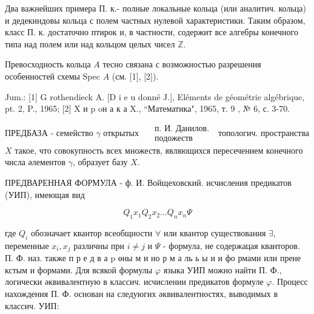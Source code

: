 \documentclass[10pt]{article}
\begin{document}
Два важнейших примера П. к.- полные локальные кольца (или аналитич. кольца) и дедекиндовы кольца с полем частных нулевой характеристики. Таким образом, класс П. к. достаточно птирок и, в частности, содержит все алгебры конечного типа над полем или над кольцом целых чисел $\mathbb{Z}$.



Превосходность кольца $A$ тесно связана с возможностью разрешения особенностей схемы Spec $A$ (см. [1], [2]).



Jum.: [1] G rothendieck A. [D i e u donné J.], Eléments de géométrie algébrique, pt. 2, P., 1965; [2] X и p oн а к а X., “Математика", 1965, т. 9 , № 6, с. 3-70.



ПРЕДБАЗА - семейство $\gamma$ открытых $\begin{aligned} & \text { п. И. Данилов. } \\ & \text { подожеств }\end{aligned}$ топологич. пространства $X$ такое, что совокупность всех множеств, являющихся пересечением конечного числа әлементов $\gamma$, образует базу $X$.



ПРЕДВАРЕННАЯ ФОРМУЛА - ф. И. Войщеховский. исчисления предикатов (УИП), имеющая вид



\[

Q_{1} x_{1} Q_{2} x_{2} \ldots Q_{n} x_{n} \Psi

\]



где $Q_{i}$ обозначает квантор всеобщности $\forall$ или квантор существования $\exists$, переменные $x_{i}, x_{j}$ различны при $i \neq j$ и $\Psi$ - формула, не содержацая кванторов. П. Ф. наз. также п р е д в а $\mathrm{p}$ өны м и но р м а ль ь ы и и фо рмами или прене кстым и формами. Для всякой формулы $\varphi$ языка УИП можно найти П. Ф., логически әквивалентную в классич. исчислении предикатов формуле $\varphi$. Процесс нахождения П. Ф. основан на следуюгих әквивалентностях, выводимых в классич. УИП:
\end{document}
